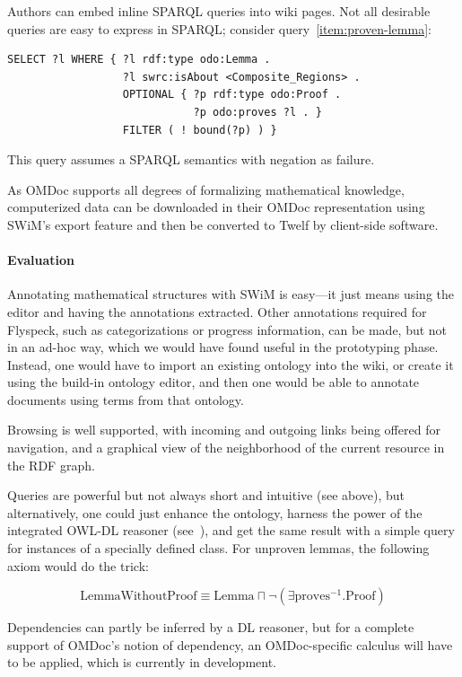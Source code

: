 Authors can embed inline SPARQL queries into wiki pages.  Not all desirable
queries are easy to express in SPARQL; consider query~\ref{item:proven-lemma}:

\begin{lstlisting}
SELECT ?l WHERE { ?l rdf:type odo:Lemma .
                  ?l swrc:isAbout <Composite_Regions> .
                  OPTIONAL { ?p rdf:type odo:Proof .
                             ?p odo:proves ?l . }
                  FILTER ( ! bound(?p) ) }
\end{lstlisting}

This query assumes a SPARQL semantics with negation as
failure\cite{Polleres:SPARQL-Rules07}.

As OMDoc supports all degrees of formalizing mathematical knowledge,
computerized data can be downloaded in their OMDoc representation using SWiM's
export feature and then be converted to Twelf by client-side
software\cite[chap.\ 25.2]{Kohlhase:omdoc1.2}.

\paragraph{Evaluation} Annotating mathematical structures with SWiM is easy---it
just means using the editor and having the annotations extracted.  Other
annotations required for Flyspeck, such as categorizations or progress
information, can be made, but not in an ad-hoc way, which we would have found
useful in the prototyping phase.  Instead, one would have to import an existing
ontology into the wiki, or create it using the build-in ontology editor, and
then one would be able to annotate documents using terms from that ontology.

Browsing is well supported, with incoming and outgoing links being offered for
navigation, and a graphical view of the neighborhood of the current resource in
the RDF graph.

Queries are powerful but not always short and intuitive (see above), but
alternatively, one could just enhance the ontology, harness the power of the
integrated  OWL-DL reasoner
(see~\cite{KrSchVr:semwiki-reasoning07}), and get the same result with a simple
query for instances of a specially defined class.  For unproven lemmas, the
following axiom would do the trick:

\[
\mbox{LemmaWithoutProof}\equiv\mbox{Lemma}\sqcap\neg(\exists\mbox{proves}^{-1}.\mbox{Proof})
\]

Dependencies can partly be inferred by a DL reasoner, but for a complete support
of OMDoc's notion of dependency, an OMDoc-specific calculus will have to be
applied, which is currently in development.

